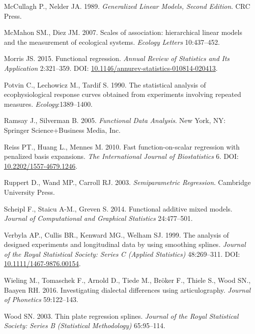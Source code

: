\documentclass[12pt]{article}
\begin{document}
\hypertarget{ref-McCullagh:1989ti}{}
McCullagh P., Nelder JA. 1989. \emph{Generalized Linear Models, Second
Edition}. CRC Press.

\hypertarget{ref-McMahon:2007ju}{}
McMahon SM., Diez JM. 2007. Scales of association: hierarchical linear
models and the measurement of ecological systems. \emph{Ecology Letters}
10:437--452.

\hypertarget{ref-morris_functional_2015}{}
Morris JS. 2015. Functional regression. \emph{Annual Review of
Statistics and Its Application} 2:321--359. DOI:
\href{https://doi.org/10.1146/annurev-statistics-010814-020413}{10.1146/annurev-statistics-010814-020413}.

\hypertarget{ref-potvin_statistical_1990}{}
Potvin C., Lechowicz M., Tardif S. 1990. The statistical analysis of
ecophysiological response curves obtained from experiments involving
repeated measures. \emph{Ecology}:1389--1400.

\hypertarget{ref-ramsay_functional_2005}{}
Ramsay J., Silverman B. 2005. \emph{Functional Data Analysis}. New York,
NY: Springer Science+Business Media, Inc.

\hypertarget{ref-reiss_fast_2010}{}
Reiss PT., Huang L., Mennes M. 2010. Fast function-on-scalar regression
with penalized basis expansions. \emph{The International Journal of
Biostatistics} 6. DOI:
\href{https://doi.org/10.2202/1557-4679.1246}{10.2202/1557-4679.1246}.

\hypertarget{ref-Ruppert:2003uc}{}
Ruppert D., Wand MP., Carroll RJ. 2003. \emph{Semiparametric
Regression}. Cambridge University Press.

\hypertarget{ref-scheipl_functional_2014}{}
Scheipl F., Staicu A-M., Greven S. 2014. Functional additive mixed
models. \emph{Journal of Computational and Graphical Statistics}
24:477--501.

\hypertarget{ref-verbyla_analysis_2002}{}
Verbyla AP., Cullis BR., Kenward MG., Welham SJ. 1999. The analysis of
designed experiments and longitudinal data by using smoothing splines.
\emph{Journal of the Royal Statistical Society: Series C (Applied
Statistics)} 48:269--311. DOI:
\href{https://doi.org/10.1111/1467-9876.00154}{10.1111/1467-9876.00154}.

\hypertarget{ref-wieling_investigating_2016}{}
Wieling M., Tomaschek F., Arnold D., Tiede M., Bröker F., Thiele S.,
Wood SN., Baayen RH. 2016. Investigating dialectal differences using
articulography. \emph{Journal of Phonetics} 59:122--143.

\hypertarget{ref-wood_thin_2003}{}
Wood SN. 2003. Thin plate regression splines. \emph{Journal of the Royal
Statistical Society: Series B (Statistical Methodology)} 65:95--114.
\end{document}
